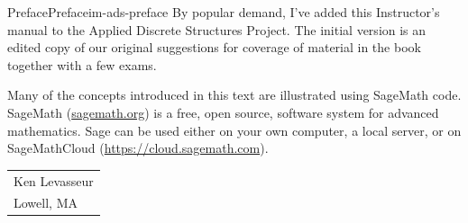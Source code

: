 \documentclass[oneside,10pt,]{book}
\begin{document}
%
\begin{preface}{Preface}{}{Preface}{}{}{im-ads-preface}
\hypertarget{p-1}{}%
By popular demand, I've added this Instructor's manual to the Applied Discrete Structures Project.  The initial version is an edited copy of our original suggestions for coverage of material in the book together with a few exams.%
\par
\hypertarget{p-2}{}%
Many of the concepts introduced in this text are illustrated using SageMath code.  SageMath (\href{http://sagemath.org}{sagemath.org}) is a free, open source, software system for advanced mathematics.  Sage can be used either on your own computer, a local server, or on SageMathCloud (\href{https://cloud.sagemath.com}{https:\slash{}\slash{}cloud.sagemath.com}).%
\nopagebreak\par%
\hfill\begin{tabular}{l@{}}
Ken Levasseur\\
Lowell, MA
\end{tabular}\\\par
\end{preface}
\setcounter{tocdepth}{1}
\renewcommand*\contentsname{Contents}
\tableofcontents
\mainmatter
%
%
\typeout{************************************************}
\typeout{************************************************}
%
\end{document}
